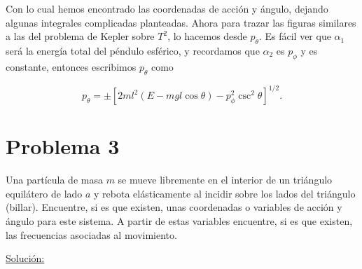 \documentclass[a4paper,10pt]{article}
\numberwithin{equation}{section}
\begin{document}
Con lo cual hemos encontrado las coordenadas de acción y ángulo, dejando algunas 
integrales complicadas planteadas. Ahora para trazar las figuras similares a las 
del problema de Kepler sobre $T^2$, lo hacemos desde $p_\theta$. Es fácil ver que 
$\alpha_1$ será la energía total del péndulo esférico, y recordamos que $\alpha_2$ 
es $p_\phi$ y es constante, entonces escribimos $p_\theta$ como 

\begin{equation}
 p_\theta = \pm \left[
 2ml^2(E - mgl\cos{\theta}) -  p_\phi^2\csc^2{\theta}\right]^{1/2}.
\end{equation}

\section{Problema 3}

Una partícula de masa $m$ se mueve libremente en el interior de un triángulo  
equilátero de lado $a$ y rebota elásticamente al incidir sobre los lados del triángulo 
(billar). Encuentre, si es que existen, unas coordenadas o variables de acción 
y ángulo para este sistema. A partir de estas variables encuentre, si es que existen,
las frecuencias asociadas al movimiento. 

\vspace{.3cm}

\underline{Solución:} \vspace{.3cm}
\end{document}
